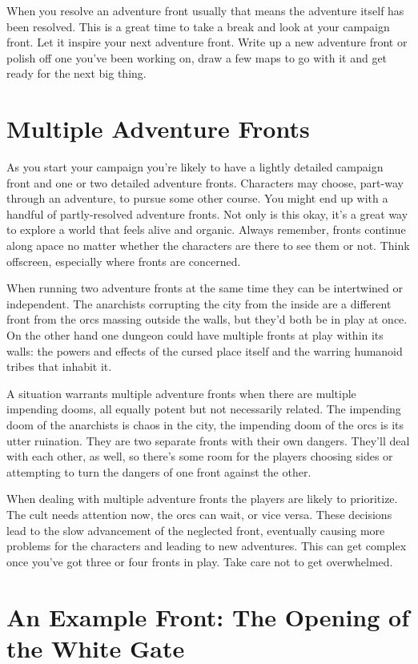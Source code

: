  When you resolve an adventure front usually that means the adventure itself has been resolved. This is a great time to take a break and look at your campaign front. Let it inspire your next adventure front. Write up a new adventure front or polish off one you've been working on, draw a few maps to go with it and get ready for the next big thing.
\section*{Multiple Adventure Fronts}


 As you start your campaign you're likely to have a lightly detailed campaign front and one or two detailed adventure fronts. Characters may choose, part-way through an adventure, to pursue some other course. You might end up with a handful of partly-resolved adventure fronts. Not only is this okay, it's a great way to explore a world that feels alive and organic. Always remember, fronts continue along apace no matter whether the characters are there to see them or not. Think offscreen, especially where fronts are concerned.


 When running two adventure fronts at the same time they can be intertwined or independent. The anarchists corrupting the city from the inside are a different front from the orcs massing outside the walls, but they'd both be in play at once. On the other hand one dungeon could have multiple fronts at play within its walls: the powers and effects of the cursed place itself and the warring humanoid tribes that inhabit it.


 A situation warrants multiple adventure fronts when there are multiple impending dooms, all equally potent but not necessarily related. The impending doom of the anarchists is chaos in the city, the impending doom of the orcs is its utter ruination. They are two separate fronts with their own dangers. They'll deal with each other, as well, so there's some room for the players choosing sides or attempting to turn the dangers of one front against the other.


 When dealing with multiple adventure fronts the players are likely to prioritize. The cult needs attention now, the orcs can wait, or vice versa. These decisions lead to the slow advancement of the neglected front, eventually causing more problems for the characters and leading to new adventures. This can get complex once you've got three or four fronts in play. Take care not to get overwhelmed.
\section*{An Example Front: The Opening of the White Gate}
